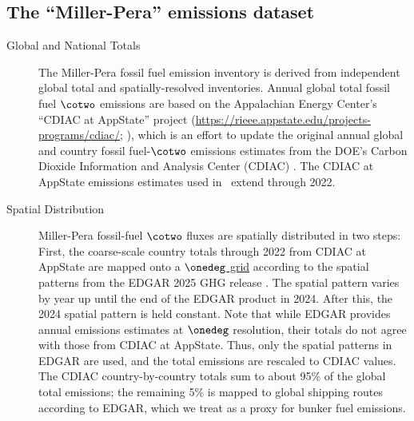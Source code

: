 \subsection{The ``Miller-Pera'' emissions dataset}\label{sec:ff_miller}

\begin{description}
\item[Global and National Totals]  The Miller-Pera fossil fuel emission
  inventory \citep{pera26a} is derived from independent global total and
  spatially-resolved inventories.  Annual global total fossil fuel
  $\cotwo$ emissions are based on the Appalachian Energy Center’s
  “CDIAC at AppState” project
  (\href{https://rieee.appstate.edu/projects-programs/cdiac/}{https://rieee.appstate.edu/projects-programs/cdiac/};
  \citealp{erb26a}),
  which is an effort to update the original annual global and country
  fossil fuel-$\cotwo$ emissions estimates from the DOE’s Carbon Dioxide
  Information and Analysis Center (CDIAC) \citep{boden17a}. The
  CDIAC at AppState emissions estimates used in \ctver\ extend through
  2022.

\item[Spatial Distribution] Miller-Pera fossil-fuel $\cotwo$ fluxes are
  spatially distributed in two steps: First, the coarse-scale country
  totals through 2022 from CDIAC at AppState are mapped onto a
  \href{http://data.giss.nasa.gov/landuse/country.html}{$\onedeg$
    grid} according to the spatial patterns from the EDGAR 2025 GHG
  release \citep{crippa25a}. The spatial pattern varies
  by year up until the end of the EDGAR product in 2024.  After
  this, the 2024 spatial pattern is held constant.
  Note that while EDGAR provides annual emissions estimates at
  $\onedeg$ resolution, their totals do not agree with those from
  CDIAC at AppState. Thus, only the spatial patterns in EDGAR are
  used, and the total emissions are rescaled to CDIAC values.
  The CDIAC country-by-country totals sum to about 95\% of the
  global total emissions; the remaining 5\% is mapped to global
  shipping routes according to EDGAR, which we treat as a proxy for
  bunker fuel emissions.


\end{description}
